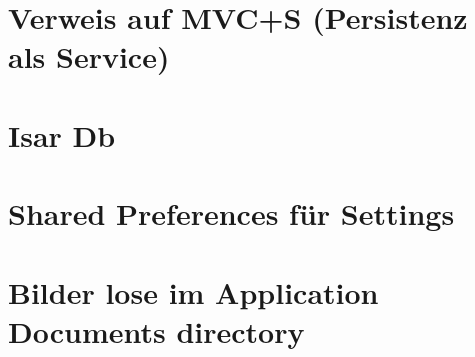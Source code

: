 \section{Verweis auf MVC+S (Persistenz als Service)}


\section{Isar Db}


\section{Shared Preferences für Settings}


\section{Bilder lose im Application Documents directory}